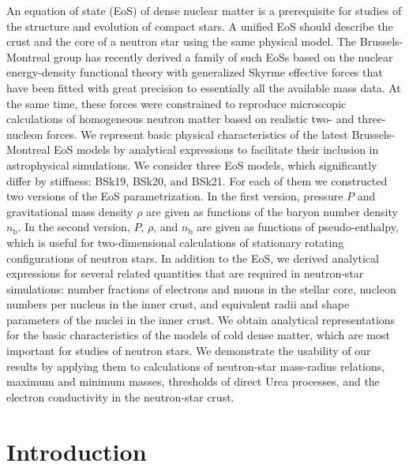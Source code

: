\documentclass{aa}
\newcommand{\nb}{n_\mathrm{b}}
\begin{document}
\abstract
{An equation of state (EoS) of dense nuclear matter is
a prerequisite for studies of the structure and evolution of
compact stars. 
A unified EoS should describe the crust and the core of a
neutron star using the same physical model.
The Brussels-Montreal group has recently derived
a family of such EoSs based on the nuclear energy-density 
functional theory with generalized Skyrme effective forces
that have been fitted with great precision to essentially all the available
mass data. At the same time, these forces were constrained to reproduce 
microscopic calculations of homogeneous neutron matter based on realistic
two- and three-nucleon forces.
}{
We represent basic physical
characteristics of the latest Brussels-Montreal EoS models by
analytical expressions
to facilitate their inclusion in
astrophysical simulations.
}{
We consider three EoS models, which significantly differ by stiffness: BSk19, 
BSk20, and BSk21. For each of them we constructed two versions of the EoS
parametrization. In the first version, pressure $P$ and gravitational mass
density $\rho$ are given as functions of the baryon number density $\nb$. In
the second version, $P$, $\rho$, and $\nb$ are given as functions of 
pseudo-enthalpy, which is useful for two-dimensional calculations of stationary
rotating configurations of neutron stars. In addition to the
EoS, we derived
analytical expressions for several related quantities that are required in 
neutron-star simulations: number fractions of electrons and muons in the 
stellar core, nucleon numbers per nucleus in the inner crust,
and equivalent radii 
and shape parameters of the nuclei in the inner crust.
}{
We obtain analytical representations for the basic
characteristics of the models of cold dense matter,
which are most important for studies of neutron
stars. We demonstrate the usability of our results by
applying them to calculations of neutron-star mass-radius
relations, maximum and minimum masses, thresholds of direct
Urca processes, and the electron conductivity in
the neutron-star crust.
}
{}


\maketitle

\section{Introduction}
\label{sect:introd}
\end{document}
